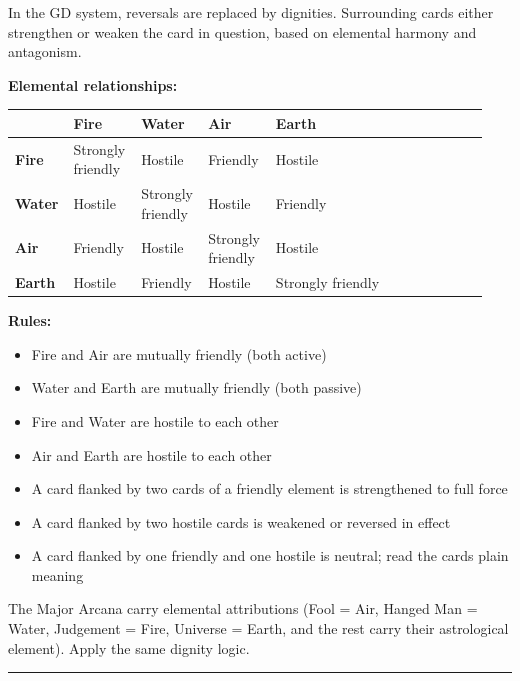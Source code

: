 In the GD system, reversals are replaced by dignities. Surrounding cards either strengthen or weaken the card in question, based on elemental harmony and antagonism.

\textbf{Elemental relationships:}

\begin{longtable}[]{@{}>{\RaggedRight\small}p{0.10\linewidth}>{\RaggedRight\small}p{0.14\linewidth}>{\RaggedRight\small}p{0.12\linewidth}>{\RaggedRight\small}p{0.14\linewidth}>{\RaggedRight\small}p{0.44\linewidth}@{}}
\toprule\noalign{}
& Fire & Water & Air & Earth \\
\midrule\noalign{}
\endhead
\bottomrule\noalign{}
\endlastfoot
\textbf{Fire} & Strongly friendly & Hostile & Friendly & Hostile \\
\textbf{Water} & Hostile & Strongly friendly & Hostile & Friendly \\
\textbf{Air} & Friendly & Hostile & Strongly friendly & Hostile \\
\textbf{Earth} & Hostile & Friendly & Hostile & Strongly friendly \\
\end{longtable}

\textbf{Rules:}

\begin{itemize}
\tightlist
\item
  Fire and Air are mutually friendly (both active)
\item
  Water and Earth are mutually friendly (both passive)
\item
  Fire and Water are hostile to each other
\item
  Air and Earth are hostile to each other
\item
  A card flanked by two cards of a friendly element is strengthened to full force
\item
  A card flanked by two hostile cards is weakened or reversed in effect
\item
  A card flanked by one friendly and one hostile is neutral; read the card\textquotesingle s plain meaning
\end{itemize}

The Major Arcana carry elemental attributions (Fool = Air, Hanged Man = Water, Judgement = Fire, Universe = Earth, and the rest carry their astrological element). Apply the same dignity logic.

\begin{center}\rule{0.5\linewidth}{0.5pt}\end{center}

